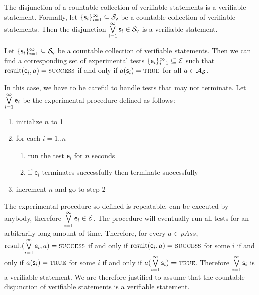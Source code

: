 \documentclass[11pt,letterpaper,fleqn]{memoir} %
\begin{document}
\begin{mathSection}
	\begin{axiom}\label{ax_verifiable_OR}
	The disjunction of a countable collection of verifiable statements is a verifiable statement. Formally, let $\{\mathsf{s}_i\}_{i=1}^{\infty} \subseteq \mathcal{S}_\textsf{v}$ be a countable collection of verifiable statements. Then the disjunction $\bigvee\limits_{i=1}^{\infty} \mathsf{s}_i \in \mathcal{S}_\textsf{v}$ is a verifiable statement.
	\end{axiom}
	\begin{justification}
		Let $\{\mathsf{s}_i\}_{i=1}^{\infty} \subseteq \mathcal{S}_\textsf{v}$ be a countable collection of verifiable statements. Then we can find a corresponding set of experimental tests $\{\mathsf{e}_i\}_{i=1}^{\infty} \subseteq \mathcal{E}$ such that $\operatorname{result}(\mathsf{e}_i, a) = \textsc{success}$ if and only if $a(\mathsf{s}_i) = \textsc{true}$ for all $a \in \mathcal{A}_{\mathcal{S}}$.
		
		
		In this case, we have to be careful to handle tests that may not terminate. Let $\bigvee\limits_{i=1}^{\infty} \mathsf{e}_i$ be the experimental procedure defined as follows:
		\begin{enumerate}
			\item initialize $n$ to 1
			\item for each $i=1..n$
			\begin{enumerate}
				\item run the test $\mathsf{e}_i$ for $n$ seconds
				\item if $\mathsf{e}_i$ terminates successfully then terminate successfully
			\end{enumerate}
			\item increment $n$ and go to step 2
		\end{enumerate}
		The experimental procedure so defined is repeatable, can be executed by anybody, therefore $\bigvee\limits_{i=1}^{\infty} \mathsf{e}_i \in \mathcal{E}$. The procedure will eventually run all tests for an arbitrarily long amount of time. Therefore, for every $a \in pAss$, $\operatorname{result}(\bigvee\limits_{i=1}^{\infty} \mathsf{e}_i, a) = \textsc{success}$ if and only if $\operatorname{result}(\mathsf{e}_i, a) = \textsc{success}$ for some $i$ if and only if $a(\mathsf{s}_i) = \textsc{true}$ for some $i$ if and only if $a(\bigvee\limits_{i=1}^{\infty}\mathsf{s}_i) = \textsc{true}$. Therefore $\bigvee\limits_{i=1}^{\infty}\mathsf{s}_i$ is a verifiable statement. We are therefore justified to assume that the countable disjunction of verifiable statements is a verifiable statement.


\end{justification}
\end{mathSection}
\end{document}
